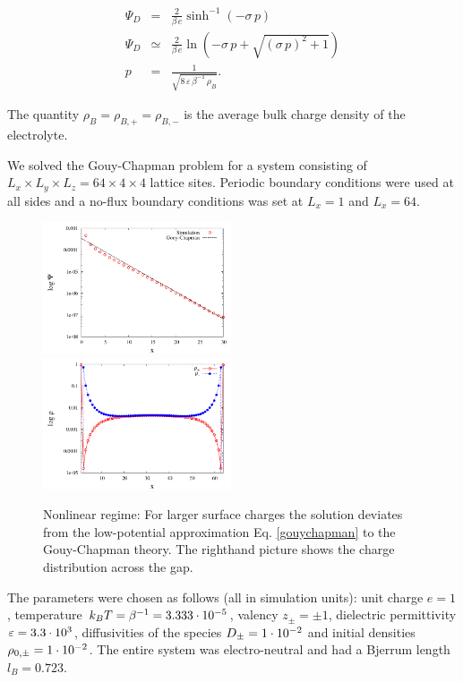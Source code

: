 \begin{eqnarray}
\Psi_D&=&\frac{2}{\beta \,e} \sinh^{-1}\left(-\sigma\,p\right)\\
\Psi_D&\simeq&\frac{2}{\beta \,e} \ln\left(-\sigma \, p + \sqrt{(\sigma\,p)^2+1}\right)\\
p &=& \frac{1}{\sqrt{8\, \varepsilon\, \beta^{-1} \,\rho_B}}.
\end{eqnarray}

The quantity $\rho_B=\rho_{B,+}=\rho_{B,-}$ is 
the average bulk charge density of the electrolyte.

We solved the Gouy-Chapman problem for a 
system consisting of $L_x \times L_y \times L_z=64\times4\times4$
lattice sites. Periodic boundary conditions were used at all sides 
and a no-flux boundary conditions was set at $L_x=1$ and $L_x=64$.

\begin{figure}[htpb]
\includegraphics[width=0.495\textwidth]{./pics/test3.pdf}
\includegraphics[width=0.495\textwidth]{./pics/test3-rho.pdf}
\caption{Nonlinear regime: For larger surface charges the solution deviates from the low-potential approximation Eq. \ref{gouychapman} to the Gouy-Chapman theory. The righthand picture shows the charge distribution across the gap.} 
\label{fig2} 
\end{figure}

 
The parameters were chosen as follows (all in simulation units):
unit charge $e=1$, temperature $k_B T=\beta^{-1}=3.333\cdot10^{-5}$, valency $z_{\pm}=\pm1$, 
dielectric permittivity $\varepsilon=3.3\cdot10^{3}$, diffusivities 
of the species $D_{\pm}=1\cdot10^{-2}$ and initial densities $\rho_{0,\pm}=1\cdot10^{-2}$.
The entire system was electro-neutral and had a Bjerrum length $l_B=0.723$.

